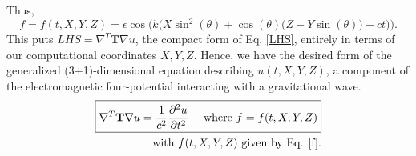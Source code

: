 \documentclass{article}
\begin{document}
Thus, \begin{equation} \label{f}
f=f(t,X,Y,Z)=\epsilon \cos\big(k\big(X \sin ^2(\theta )+\cos (\theta ) \big(Z-Y \sin (\theta )\big)-ct\big)\big).
\end{equation}
This puts $LHS = \nabla^T \textbf{T} \nabla u$, the compact form of Eq. \ref{LHS}, entirely in terms of our computational coordinates $X,Y,Z$. Hence, we have the desired form of the generalized (3+1)-dimensional equation describing $u(t,X,Y,Z)$, a component of the electromagnetic four-potential interacting with a gravitational wave.
\begin{align}\label{main eqn}
\boxed{
\nabla^T \textbf{T} \nabla u = \frac{1}{c^2}\frac{\partial^2 u}{\partial t^2} \ \ \ \ \mbox{where } f=f(t,X,Y,Z)
}\\
\text{with $f(t,X,Y,Z)$ given by Eq. \ref{f}.} \nonumber
\end{align}
\end{document}
